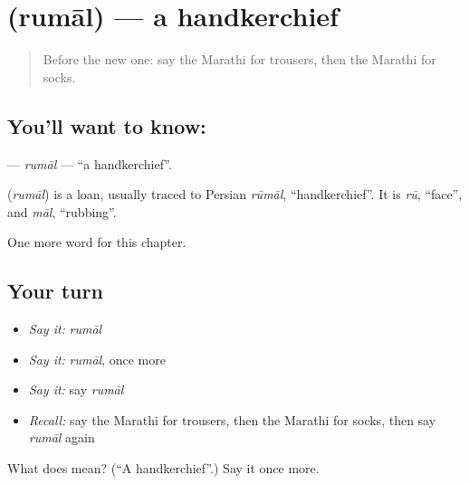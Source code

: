 \section[\texorpdfstring{\mr{रुमाल} (rumāl)}{रुमाल (rumāl)}]{ (rumāl) — a handkerchief}

\label{lesson:MR-C187-rumal}



\begin{quote}
Before the new one: say the Marathi for trousers, then the Marathi for socks.
\end{quote}

\subsection*{You'll want to know: }
\textbf{} — \emph{rumāl} — \textquotedblleft{}a handkerchief\textquotedblright{}.

\begin{cousinweb}
\textbf{} (\emph{rumāl}) is a loan, usually traced to Persian \emph{rūmāl}, \textquotedblleft{}handkerchief\textquotedblright{}. It is \emph{rū}, \textquotedblleft{}face\textquotedblright{}, and \emph{māl}, \textquotedblleft{}rubbing\textquotedblright{}.
\end{cousinweb}

\begin{grammarlens}[title={What you've built}]
One more word for this chapter.
\end{grammarlens}

\subsection*{Your turn}
\begin{itemize}
\raggedright
  \item \emph{Say it:} \emph{rumāl}
  \item \emph{Say it:} \emph{rumāl}, once more
  \item \emph{Say it:} say \emph{rumāl}
  \item \emph{Recall:} say the Marathi for trousers, then the Marathi for socks, then say \emph{rumāl} again
\end{itemize}

\begin{tcolorbox}[breakable,colback=teal!4,colframe=teal!35!black,title={Before you move on}]
What does  mean? (\textquotedblleft{}A handkerchief\textquotedblright{}.) Say it once more.
\end{tcolorbox}

